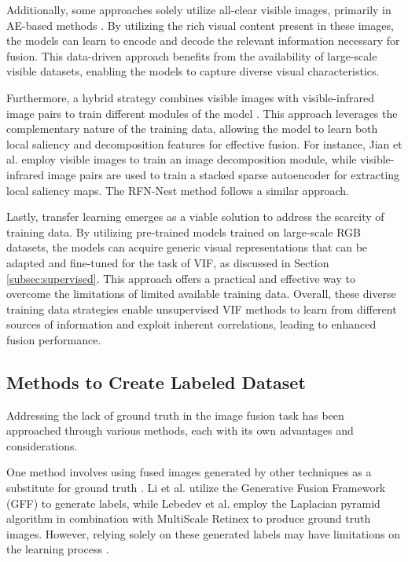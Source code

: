 Additionally, some approaches solely utilize all-clear visible images, primarily in AE-based methods \cite{li2019infrared}. By utilizing the rich visual content present in these images, the models can learn to encode and decode the relevant information necessary for fusion. This data-driven approach benefits from the availability of large-scale visible datasets, enabling the models to capture diverse visual characteristics.

Furthermore, a hybrid strategy combines visible images with visible-infrared image pairs to train different modules of the model \cite{jian2021infrared}. This approach leverages the complementary nature of the training data, allowing the model to learn both local saliency and decomposition features for effective fusion. For instance, Jian et al. \cite{li2021rfn} employ visible images to train an image decomposition module, while visible-infrared image pairs are used to train a stacked sparse autoencoder for extracting local saliency maps. The RFN-Nest method \cite{li2021rfn} follows a similar approach.

Lastly, transfer learning emerges as a viable solution to address the scarcity of training data. By utilizing pre-trained models trained on large-scale RGB datasets, the models can acquire generic visual representations that can be adapted and fine-tuned for the task of VIF, as discussed in Section \ref{subsec:supervised}. This approach offers a practical and effective way to overcome the limitations of limited available training data. Overall, these diverse training data strategies enable unsupervised VIF methods to learn from different sources of information and exploit inherent correlations, leading to enhanced fusion performance.

\subsection{Methods to Create Labeled Dataset}

Addressing the lack of ground truth in the image fusion task has been approached through various methods, each with its own advantages and considerations.

One method involves using fused images generated by other techniques as a substitute for ground truth \cite{li2019coupled, lebedev2019multisensor}. Li et al. \cite{li2019coupled} utilize the Generative Fusion Framework (GFF) \cite{li2013image} to generate labels, while Lebedev et al. \cite{lebedev2019multisensor} employ the Laplacian pyramid algorithm in combination with MultiScale Retinex \cite{petro2014multiscale} to produce ground truth images. However, relying solely on these generated labels may have limitations on the learning process \cite{ma2020ganmcc}.

